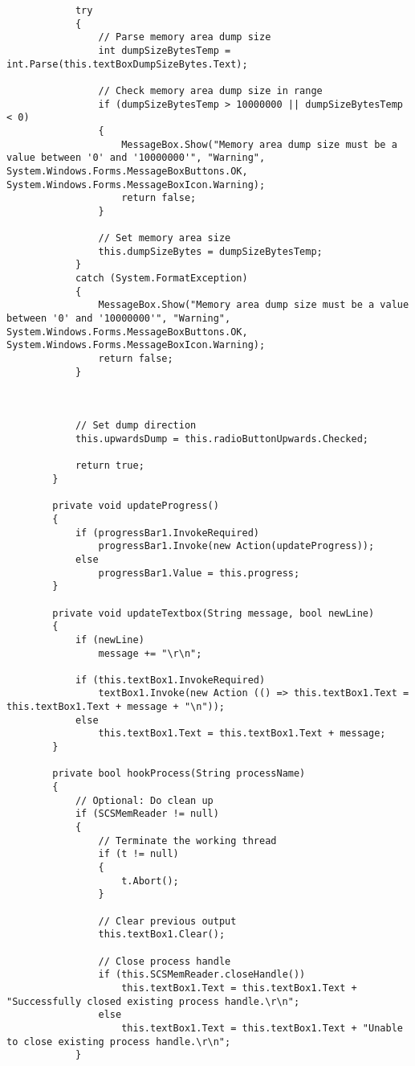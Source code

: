 \begin{lstlisting}
            try
            {
                // Parse memory area dump size
                int dumpSizeBytesTemp = int.Parse(this.textBoxDumpSizeBytes.Text);

                // Check memory area dump size in range
                if (dumpSizeBytesTemp > 10000000 || dumpSizeBytesTemp < 0)
                {
                    MessageBox.Show("Memory area dump size must be a value between '0' and '10000000'", "Warning", System.Windows.Forms.MessageBoxButtons.OK, System.Windows.Forms.MessageBoxIcon.Warning);
                    return false;
                }

                // Set memory area size
                this.dumpSizeBytes = dumpSizeBytesTemp;
            }
            catch (System.FormatException)
            {
                MessageBox.Show("Memory area dump size must be a value between '0' and '10000000'", "Warning", System.Windows.Forms.MessageBoxButtons.OK, System.Windows.Forms.MessageBoxIcon.Warning);
                return false;
            }



            // Set dump direction
            this.upwardsDump = this.radioButtonUpwards.Checked;

            return true;
        }

        private void updateProgress()
        {
            if (progressBar1.InvokeRequired)
                progressBar1.Invoke(new Action(updateProgress));
            else
                progressBar1.Value = this.progress;
        }

        private void updateTextbox(String message, bool newLine)
        {
            if (newLine)
                message += "\r\n";

            if (this.textBox1.InvokeRequired)
                textBox1.Invoke(new Action (() => this.textBox1.Text = this.textBox1.Text + message + "\n"));
            else
                this.textBox1.Text = this.textBox1.Text + message;
        }

        private bool hookProcess(String processName)
        {
            // Optional: Do clean up
            if (SCSMemReader != null)
            {
                // Terminate the working thread
                if (t != null)
                {
                    t.Abort();
                }

                // Clear previous output
                this.textBox1.Clear();

                // Close process handle
                if (this.SCSMemReader.closeHandle())
                    this.textBox1.Text = this.textBox1.Text + "Successfully closed existing process handle.\r\n";
                else
                    this.textBox1.Text = this.textBox1.Text + "Unable to close existing process handle.\r\n";
            }


\end{lstlisting}
